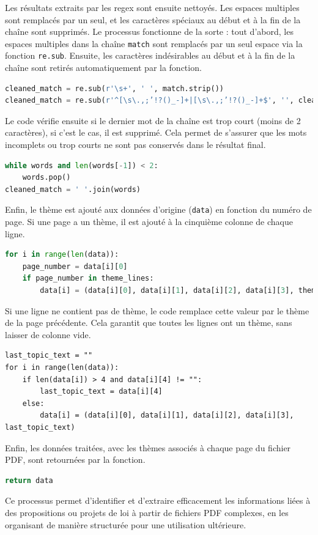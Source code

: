 Les résultats extraits par les \gls{regex} sont ensuite nettoyés. Les espaces multiples sont remplacés par un seul, et les caractères spéciaux au début et à la fin de la chaîne sont supprimés. Le processus fonctionne de la sorte : tout d'abord, les espaces multiples dans la chaîne \texttt{match} sont remplacés par un seul espace via la fonction \texttt{re.sub}. Ensuite, les caractères indésirables au début et à la fin de la chaîne sont retirés automatiquement par la fonction.
\begin{lstlisting}[language=Python]
cleaned_match = re.sub(r'\s+', ' ', match.strip())
cleaned_match = re.sub(r'^[\s\.,;’!?()_-]+|[\s\.,;’!?()_-]+$', '', cleaned_match)
\end{lstlisting}
Le code vérifie ensuite si le dernier mot de la chaîne est trop court (moins de 2 caractères), si c’est le cas, il est supprimé. Cela permet de s'assurer que les mots incomplets ou trop courts ne sont pas conservés dans le résultat final.
\begin{lstlisting}[language=Python]
while words and len(words[-1]) < 2:
    words.pop()
cleaned_match = ' '.join(words)
\end{lstlisting}
Enfin, le thème est ajouté aux données d'origine (\texttt{data}) en fonction du numéro de page. Si une page a un thème, il est ajouté à la cinquième colonne de chaque ligne.
\begin{lstlisting}[language=Python]
for i in range(len(data)):
    page_number = data[i][0]   
    if page_number in theme_lines:
        data[i] = (data[i][0], data[i][1], data[i][2], data[i][3], theme_lines[page_number])
\end{lstlisting}
Si une ligne ne contient pas de thème, le code remplace cette valeur par le thème de la page précédente. Cela garantit que toutes les lignes ont un thème, sans laisser de colonne vide.
\begin{lstlisting}
last_topic_text = ""
for i in range(len(data)):
    if len(data[i]) > 4 and data[i][4] != "":
        last_topic_text = data[i][4]
    else:
        data[i] = (data[i][0], data[i][1], data[i][2], data[i][3], last_topic_text)
\end{lstlisting}
Enfin, les données traitées, avec les thèmes associés à chaque page du fichier \gls{PDF}, sont retournées par la fonction.
\begin{lstlisting}[language=Python]
return data
\end{lstlisting}
Ce processus permet d’identifier et d’extraire efficacement les informations liées à des propositions ou projets de loi à partir de fichiers \gls{PDF} complexes, en les organisant de manière structurée pour une utilisation ultérieure.


